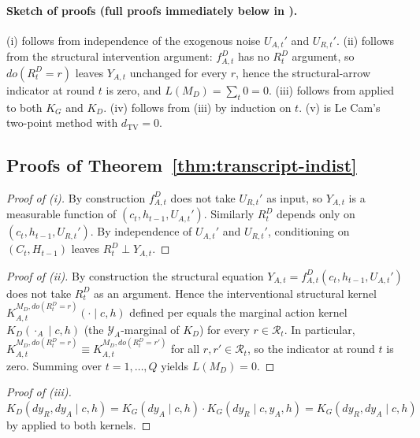 \documentclass{article}
\theoremstyle{plain}
\theoremstyle{definition}
\theoremstyle{remark}
\newcommand{\TV}{\mathrm{TV}}
\newcommand{\dtv}{d_{\TV}}
\newcommand{\YA}{\mathcal{Y}_A}
\begin{document}
\paragraph{Sketch of proofs (full proofs immediately below in ).}
(i) follows from independence of the exogenous noise $U_{A,t}'$ and $U_{R,t}'$.
(ii) follows from the structural intervention argument:
$f_{A,t}^D$ has no $R_t^D$ argument, so $\mathit{do}(R_t^D = r)$ leaves $Y_{A,t}$
unchanged for every $r$, hence the structural-arrow indicator at round $t$ is zero, and $L(M_D) = \sum_t 0 = 0$.
(iii) follows from  applied to both $K_G$ and $K_D$.
(iv) follows from (iii) by induction on $t$.
(v) is Le Cam's two-point method with $\dtv = 0$.

\subsection{Proofs of Theorem~\ref{thm:transcript-indist}}\label{sec:thm-1-proofs}

\begin{proof}[Proof of (i)]
By construction $f_{A,t}^D$ does not take $U_{R,t}'$ as input, so $Y_{A,t}$ is
a measurable function of $(c_t, h_{t-1}, U_{A,t}')$. Similarly $R_t^D$
depends only on $(c_t, h_{t-1}, U_{R,t}')$. By independence of $U_{A,t}'$ and
$U_{R,t}'$, conditioning on $(C_t, H_{t-1})$ leaves $R_t^D \perp Y_{A,t}$.
\end{proof}

\begin{proof}[Proof of (ii)]
By construction the structural equation $Y_{A,t} = f_{A,t}^D(c_t, h_{t-1}, U_{A,t}')$
does not take $R_t^D$ as an argument. Hence the interventional structural
kernel $K^{M_D, do(R_t^D = r)}_{A, t}(\cdot \mid c, h)$ defined per
 equals the marginal action kernel $K_D(\cdot_A \mid c, h)$
(the $\YA$-marginal of $K_D$) for every $r \in \mathcal R_t$. In particular,
$K^{M_D, do(R_t^D = r)}_{A, t} \equiv K^{M_D, do(R_t^D = r')}_{A, t}$ for all
$r, r' \in \mathcal R_t$, so the indicator at round $t$ is zero. Summing over
$t = 1, \ldots, Q$ yields $L(M_D) = 0$.
\end{proof}

\begin{proof}[Proof of (iii)]
$K_D(dy_R, dy_A \mid c, h) = K_G(dy_A \mid c, h) \cdot K_G(dy_R \mid c, y_A, h)
= K_G(dy_R, dy_A \mid c, h)$ by  applied to both kernels.
\end{proof}
\end{document}
